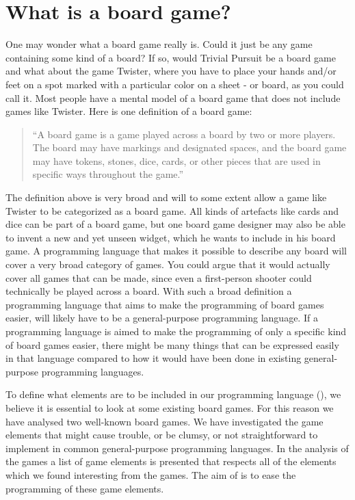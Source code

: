 \section{What is a board game?}
\label{sec:board-game-analysis}

One may wonder what a board game really is. Could it just be any game containing
some kind of a board? If so, would Trivial Pursuit be a board game and what
about the game Twister, where you have to place your hands and/or feet on a spot
marked with a particular color on a sheet - or board, as you could call it. Most
people have a mental model of a board game that does not include games like
Twister. Here is one definition of a board game:

\begin{quote}
  ``A board game is a game played across a board by two or more players. The
  board may have markings and designated spaces, and the board game may have
  tokens, stones, dice, cards, or other pieces that are used in specific ways
  throughout the game.''
  \cite{def-board-game}
\end{quote}

The definition above is very broad and will to some extent allow a game like
Twister to be categorized as a board game. All kinds of artefacts like cards and
dice can be part of a board game, but one board game designer may also be able
to invent a new and yet unseen widget, which he wants to include in his board
game. A programming language that makes it possible to describe any board will
cover a very broad category of games. You could argue that it would actually
cover all games that can be made, since even a first-person shooter could
technically be played across a board. With such a broad definition a
programming language that aims to make the programming of board games easier,
will likely have to be a general-purpose programming language. If a programming
language is aimed to make the programming of only a specific kind of board games
easier, there might be many things that can be expressed easily in that language
compared to how it would have been done in existing general-purpose programming
languages.

To define what elements are to be included in our programming language
(\productname{}), we believe it is essential to look at some existing board
games.  For this reason we have analysed two well-known board games. We have
investigated the game elements that might cause trouble, or be clumsy, or not
straightforward to implement in common general-purpose programming languages. In
the analysis of the games a list of game elements is presented that respects all
of the elements which we found interesting from the games. The aim of
\productname{} is to ease the programming of these game elements.

